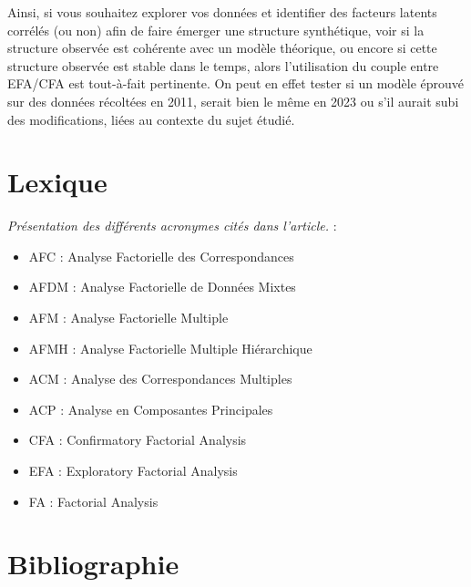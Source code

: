 \documentclass[
  french,
  11pt,
  a4paper,
]{article}
\providecommand{\tightlist}{%
  \setlength{\itemsep}{0pt}\setlength{\parskip}{0pt}}
\begin{document}
Ainsi, si vous souhaitez explorer vos données et identifier des facteurs
latents corrélés (ou non) afin de faire émerger une structure
synthétique, voir si la structure observée est cohérente avec un modèle
théorique, ou encore si cette structure observée est stable dans le
temps, alors l'utilisation du couple entre EFA/CFA est tout-à-fait
pertinente. On peut en effet tester si un modèle éprouvé sur des données
récoltées en 2011, serait bien le même en 2023 ou s'il aurait subi des
modifications, liées au contexte du sujet étudié.

\section*{Lexique}\label{lexique}

\emph{Présentation des différents acronymes cités dans l'article.} :

\begin{itemize}
\tightlist
\item
  AFC : Analyse Factorielle des Correspondances
\item
  AFDM : Analyse Factorielle de Données Mixtes
\item
  AFM : Analyse Factorielle Multiple
\item
  AFMH : Analyse Factorielle Multiple Hiérarchique
\item
  ACM : Analyse des Correspondances Multiples
\item
  ACP : Analyse en Composantes Principales
\item
  CFA : Confirmatory Factorial Analysis
\item
  EFA : Exploratory Factorial Analysis
\item
  FA : Factorial Analysis
\end{itemize}

\section*{Bibliographie}\label{bibliographie}
\end{document}

